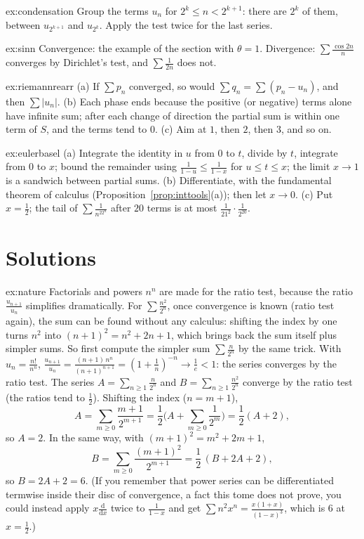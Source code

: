\begin{hint}{ex:condensation}
Group the terms $u_n$ for $2^k\le n<2^{k+1}$: there are $2^k$ of them, between $u_{2^{k+1}}$ and $u_{2^k}$. Apply the test twice for the last series.
\end{hint}
\begin{hint}{ex:sinn}
Convergence: the example of the section with $\theta=1$. Divergence: $\sum\frac{\cos2n}n$ converges by Dirichlet's test, and $\sum\frac1{2n}$ does not.
\end{hint}
\begin{hint}{ex:riemannrearr}
(a) If $\sum p_n$ converged, so would $\sum q_n=\sum(p_n-u_n)$, and then $\sum|u_n|$. (b) Each phase ends because the positive (or negative) terms alone have infinite sum; after each change of direction the partial sum is within one term of $S$, and the terms tend to $0$. (c) Aim at $1$, then $2$, then $3$, and so on.
\end{hint}
\begin{hint}{ex:eulerbasel}
(a) Integrate the identity in $u$ from $0$ to $t$, divide by $t$, integrate from $0$ to $x$; bound the remainder using $\frac1{1-u}\le\frac1{1-x}$ for $u\le t\le x$; the limit $x\to1$ is a sandwich between partial sums. (b) Differentiate, with the fundamental theorem of calculus (Proposition~\ref{prop:inttools}(a)); then let $x\to0$. (c) Put $x=\frac12$; the tail of $\sum\frac1{n^22^n}$ after $20$ terms is at most $\frac1{21^2}\cdot\frac1{2^{20}}$.
\end{hint}

\section{Solutions}
\begin{solution}{ex:nature}
\idea Factorials and powers $n^n$ are made for the ratio test, because the ratio $\frac{u_{n+1}}{u_n}$ simplifies dramatically. For $\sum\frac{n^2}{2^n}$, once convergence is known (ratio test again), the sum can be found without any calculus: shifting the index by one turns $n^2$ into $(n+1)^2=n^2+2n+1$, which brings back the sum itself plus simpler sums. So first compute the simpler sum $\sum\frac n{2^n}$ by the same trick.
\writeup With $u_n=\frac{n!}{n^n}$, $\frac{u_{n+1}}{u_n}=\frac{(n+1)\,n^n}{(n+1)^{n+1}}=\left(1+\frac1n\right)^{-n}\to\frac1e<1$: the series converges by the ratio test.
The series $A=\sum_{n\ge1}\frac n{2^n}$ and $B=\sum_{n\ge1}\frac{n^2}{2^n}$ converge by the ratio test (the ratios tend to $\frac12$). Shifting the index ($n=m+1$),
\[A=\sum_{m\ge0}\frac{m+1}{2^{m+1}}=\frac12\Big(A+\sum_{m\ge0}\frac1{2^m}\Big)=\frac12(A+2),\]
so $A=2$. In the same way, with $(m+1)^2=m^2+2m+1$,
\[B=\sum_{m\ge0}\frac{(m+1)^2}{2^{m+1}}=\frac12\,(B+2A+2),\]
so $B=2A+2=6$. (If you remember that power series can be differentiated termwise inside their disc of convergence, a fact this tome does not prove, you could instead apply $x\frac{\mathrm d}{\mathrm dx}$ twice to $\frac1{1-x}$ and get $\sum n^2x^n=\frac{x(1+x)}{(1-x)^3}$, which is $6$ at $x=\frac12$.)
\end{solution}

